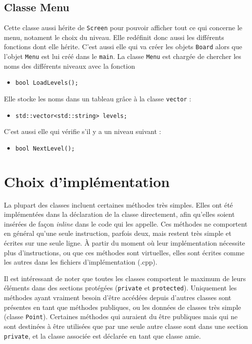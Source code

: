 \documentclass[a4paper,11pt,oneside]{article}
\begin{document}
\subsection{Classe Menu}
Cette classe aussi hérite de \verb|Screen| pour pouvoir afficher tout ce qui concerne le menu, notament le choix du niveau. Elle
redéfinit donc aussi les différents fonctions dont elle hérite. C'est aussi elle qui va créer les objets \verb|Board| alors que
l'objet \verb|Menu| est lui créé dans le \verb|main|. La classe \verb|Menu| est chargée de chercher les noms des différents niveaux
avec la fonction
\begin{itemize}
\item\verb|bool LoadLevels();|
\end{itemize}
Elle stocke les noms dans un tableau grâce à la classe \verb|vector| :
\begin{itemize}
\item\verb|std::vector<std::string> levels;|
\end{itemize}
C'est aussi elle qui vérifie s'il y a un niveau suivant :
\begin{itemize}
\item\verb|bool NextLevel();|
\end{itemize}


\newpage
\section{Choix d'implémentation}

La plupart des classes incluent certaines méthodes très simples. Elles ont été implémentées dans la déclaration de la classe directement,
afin qu'elles soient insérées de façon \emph{inline} dans le code qui les appelle. Ces méthodes ne comportent en général qu'une seule
instruction, parfois deux, mais restent très simple et écrites sur une seule ligne. À partir du moment où leur implémentation nécessite
plus d'instructions, ou que ces méthodes sont virtuelles, elles sont écrites comme les autres dans les fichiers d'implémentation (.cpp).

Il est intéressant de noter que toutes les classes comportent le maximum de leurs éléments dans des sections protégées (\verb|private| et
\verb|protected|). Uniquement les méthodes ayant vraiment besoin d'être accédées depuis d'autres classes sont présentes en tant que
méthodes publiques, ou les données de classes très simple (classe \verb|Point|). Certaines méthodes qui auraient du être publiques mais
qui ne sont destinées à être utilisées que par une seule autre classe sont dans une section \verb|private|, et la classe associée est
déclarée en tant que classe amie.
\end{document}
